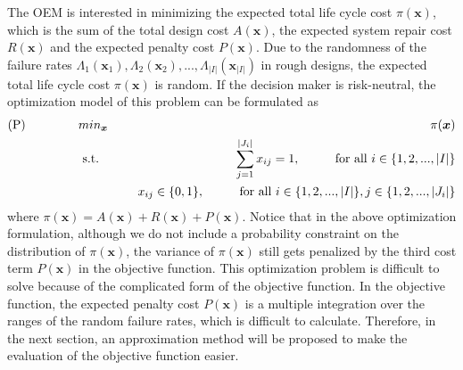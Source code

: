 \documentclass[preprint,12pt]{elsarticle}
\begin{document}
The OEM is interested in minimizing the expected total life cycle cost $\pi(\boldsymbol{x})$, which is the sum of the total design cost $A(\boldsymbol{x})$, the expected system repair cost $R(\boldsymbol{x})$ and the expected penalty cost $P(\boldsymbol{x})$. Due to the randomness of the failure rates $\Lambda_{1}(\boldsymbol{x}_{1}),\Lambda_{2}(\boldsymbol{x}_{2}),...,\Lambda_{\lvert I \rvert}(\boldsymbol{x}_{\lvert I \rvert})$ in rough designs, the expected total life cycle cost $\pi(\boldsymbol{x})$ is random. If the decision maker is risk-neutral, the optimization model of this problem can be formulated as
\begin{eqnarray}
\text{(P)} \hspace{15mm} & min_{\boldsymbol{x}} & \hspace{10mm} \pi(\boldsymbol{x}) \nonumber\\
& \text{ s.t. }&  \hspace{5mm} \sum_{j=1}^{\lvert J_{i}\rvert }{x_{ij}}=1, \hspace{10mm} \text{for all $i$}  \in \{1,2,...,\lvert I \rvert \} \nonumber\\
& & \hspace{5mm} x_{ij} \in \{0,1\}, \hspace{10mm}  \text{for all $i$}  \in \{1,2,...,\lvert I\rvert\}, j \in \{1,2,...,\lvert J_{i}\rvert\}
\end{eqnarray}
where $\pi(\boldsymbol{x})=A(\boldsymbol{x})+R(\boldsymbol{x})+P(\boldsymbol{x})$. Notice that in the above optimization formulation, although we do not include a probability constraint on the distribution of $\pi(\boldsymbol{x})$, the variance of $\pi(\boldsymbol{x})$ still gets penalized by the third cost term $P(\boldsymbol{x})$ in the objective function. This optimization problem is difficult to solve because of the complicated form of the objective function. In the objective function, the expected penalty cost $P(\boldsymbol{x})$ is a multiple integration over the ranges of the random failure rates, which is difficult to calculate. Therefore, in the next section, an approximation method will be proposed to make the evaluation of the objective function easier.
\end{document}
